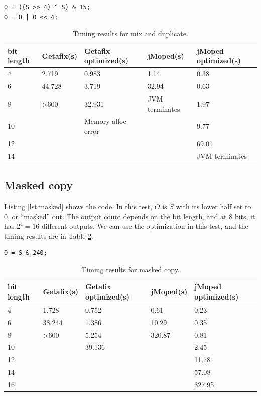 \lstset{language=C}  
\begin{lstlisting}[float=!h, caption={Mix and duplicate test program at 8 bits.},label=lst:mix]
O = ((S >> 4) ^ S) & 15;
O = O | O << 4;
\end{lstlisting}
\begin{table}[htbp]
\begin{center}
\begin{tabular}{|l|l|l|l|l|}
\hline
bit length & Getafix(s) & Getafix optimized(s) & jMoped(s) & jMoped optimized(s) \\ \hline
4 & 2.719 & 0.983 & 1.14 & 0.38 \\ \hline
6 & 44.728 & 3.719 & 32.94 & 0.63 \\ \hline
8 & \textgreater600 & 32.931 & JVM terminates & 1.97 \\ \hline
10 &  & Memory alloc error &  & 9.77 \\ \hline
12 &  &  &  & 69.01 \\ \hline
14 &  &  &  & JVM terminates \\ \hline
\end{tabular}
\end{center}
\caption{Timing results for mix and duplicate.}
\label{tbl:mix}
\end{table}

\subsection{Masked copy}
Listing \ref{lst:masked} shows the code. In this test, $O$ is $S$ with its lower half set to $0$, or ``masked'' out. The output count depends on the bit length, and at $8$ bits, it has $2^{4} = 16$ different outputs. We can use the optimization in this test, and the timing results are in Table \ref{tbl:masked}.

\lstset{language=C}  
\begin{lstlisting}[float=!h, caption={Masked copy test program at 8 bits.},label=lst:masked]
O = S & 240;
\end{lstlisting}

\begin{table}[!h]
\begin{center}
\begin{tabular}{|l|l|l|l|l|}
\hline
bit length & Getafix(s) & Getafix optimized(s) & jMoped(s) & jMoped optimized(s) \\ \hline
4 & 1.728 & 0.752 & 0.61 & 0.23 \\ \hline
6 & 38.244 & 1.386 & 10.29 & 0.35 \\ \hline
8 & \textgreater600 & 5.254 & 320.87 & 0.81 \\ \hline
10 &  & 39.136 &  & 2.45 \\ \hline
12 &  &  &  & 11.78 \\ \hline
14 &  &  &  & 57.08 \\ \hline
16 &  &  &  & 327.95 \\ \hline
\end{tabular}
\end{center}
\caption{Timing results for masked copy.}
\label{tbl:masked}
\end{table}

